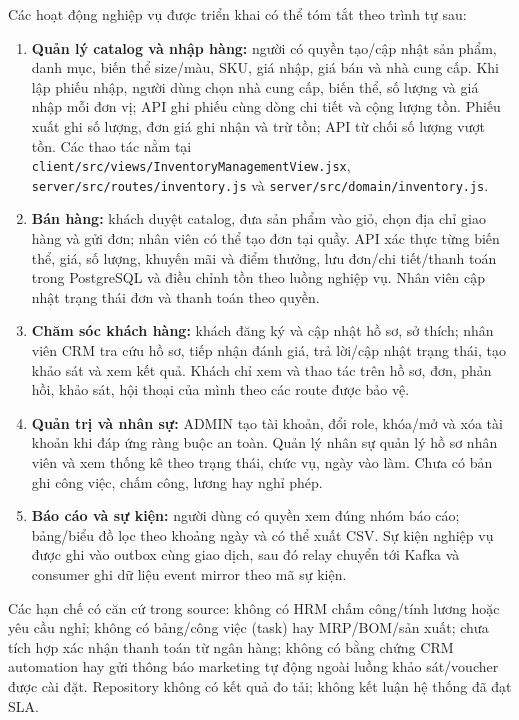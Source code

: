 Các hoạt động nghiệp vụ được triển khai có thể tóm tắt theo trình tự sau:
\begin{enumerate}
\item \textbf{Quản lý catalog và nhập hàng:} người có quyền tạo/cập nhật sản phẩm, danh mục, biến thể size/màu, SKU, giá nhập, giá bán và nhà cung cấp. Khi lập phiếu nhập, người dùng chọn nhà cung cấp, biến thể, số lượng và giá nhập mỗi đơn vị; API ghi phiếu cùng dòng chi tiết và cộng lượng tồn. Phiếu xuất ghi số lượng, đơn giá ghi nhận và trừ tồn; API từ chối số lượng vượt tồn. Các thao tác nằm tại \texttt{client/src/views/InventoryManagementView.jsx}, \texttt{server/src/routes/inventory.js} và \texttt{server/src/domain/inventory.js}.
\item \textbf{Bán hàng:} khách duyệt catalog, đưa sản phẩm vào giỏ, chọn địa chỉ giao hàng và gửi đơn; nhân viên có thể tạo đơn tại quầy. API xác thực từng biến thể, giá, số lượng, khuyến mãi và điểm thưởng, lưu đơn/chi tiết/thanh toán trong PostgreSQL và điều chỉnh tồn theo luồng nghiệp vụ. Nhân viên cập nhật trạng thái đơn và thanh toán theo quyền.
\item \textbf{Chăm sóc khách hàng:} khách đăng ký và cập nhật hồ sơ, sở thích; nhân viên CRM tra cứu hồ sơ, tiếp nhận đánh giá, trả lời/cập nhật trạng thái, tạo khảo sát và xem kết quả. Khách chỉ xem và thao tác trên hồ sơ, đơn, phản hồi, khảo sát, hội thoại của mình theo các route được bảo vệ.
\item \textbf{Quản trị và nhân sự:} ADMIN tạo tài khoản, đổi role, khóa/mở và xóa tài khoản khi đáp ứng ràng buộc an toàn. Quản lý nhân sự quản lý hồ sơ nhân viên và xem thống kê theo trạng thái, chức vụ, ngày vào làm. Chưa có bản ghi công việc, chấm công, lương hay nghỉ phép.
\item \textbf{Báo cáo và sự kiện:} người dùng có quyền xem đúng nhóm báo cáo; bảng/biểu đồ lọc theo khoảng ngày và có thể xuất CSV. Sự kiện nghiệp vụ được ghi vào outbox cùng giao dịch, sau đó relay chuyển tới Kafka và consumer ghi dữ liệu event mirror theo mã sự kiện.
\end{enumerate}

Các hạn chế có căn cứ trong source: không có HRM chấm công/tính lương hoặc yêu cầu nghỉ; không có bảng/công việc (task) hay MRP/BOM/sản xuất; chưa tích hợp xác nhận thanh toán từ ngân hàng; không có bằng chứng CRM automation hay gửi thông báo marketing tự động ngoài luồng khảo sát/voucher được cài đặt. Repository không có kết quả đo tải; không kết luận hệ thống đã đạt SLA.

